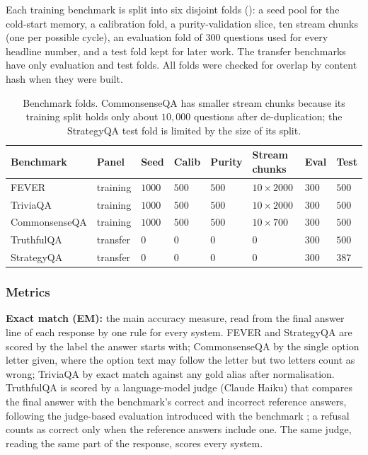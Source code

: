 Each training benchmark is split into six disjoint folds (): a seed pool for the cold-start memory, a calibration fold, a purity-validation slice, ten stream chunks (one per possible cycle), an evaluation fold of $300$ questions used for every headline number, and a test fold kept for later work. The transfer benchmarks have only evaluation and test folds. All folds were checked for overlap by content hash when they were built.

\begin{table}[!htbp]
\centering
\small
\begin{tabular}{@{}p{2.6cm}p{1.5cm}p{1.0cm}p{1.0cm}p{1.0cm}p{2.0cm}p{1.0cm}p{1.0cm}@{}}
\toprule
\textbf{Benchmark} & \textbf{Panel} & \textbf{Seed} & \textbf{Calib} & \textbf{Purity} & \textbf{Stream chunks} & \textbf{Eval} & \textbf{Test} \\
\midrule
FEVER             & training & $1000$ & $500$ & $500$ & $10\times 2000$ & $300$ & $500$ \\
TriviaQA          & training & $1000$ & $500$ & $500$ & $10\times 2000$ & $300$ & $500$ \\
CommonsenseQA     & training & $1000$ & $500$ & $500$ & $10\times 700$  & $300$ & $500$ \\
TruthfulQA        & transfer & $0$    & $0$   & $0$   & $0$             & $300$ & $500$ \\
StrategyQA        & transfer & $0$    & $0$   & $0$   & $0$             & $300$ & $387$ \\
\bottomrule
\end{tabular}
\caption[Benchmark folds.]{Benchmark folds. CommonsenseQA has smaller stream chunks because its training split holds only about $10{,}000$ questions after de-duplication; the StrategyQA test fold is limited by the size of its split.}
\label{tab:benchmark-pools}
\end{table}

\subsubsection{Metrics}
\label{sec:setup-metrics}

\textbf{Exact match (EM):} the main accuracy measure, read from the final answer line of each response by one rule for every system. FEVER and StrategyQA are scored by the label the answer starts with; CommonsenseQA by the single option letter given, where the option text may follow the letter but two letters count as wrong; TriviaQA by exact match against any gold alias after normalisation. TruthfulQA is scored by a language-model judge (Claude Haiku) that compares the final answer with the benchmark's correct and incorrect reference answers, following the judge-based evaluation introduced with the benchmark \cite{lin-etal-2022-truthfulqa}; a refusal counts as correct only when the reference answers include one. The same judge, reading the same part of the response, scores every system.

